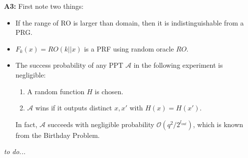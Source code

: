 \documentclass[12pt,reqno]{amsart}
\newcommand{\advrs}[0]{\mathcal{A}}
\begin{document}
\textbf{A3:} 
First note two things:
\begin{itemize}
	\item If the range of RO is larger than domain, then it is indistinguishable from a PRG.
	\item $F_k(x) = RO(k || x)$ is a PRF using random oracle $RO$.
	\item The success probability of any PPT $\advrs$ in the following experiment is negligible:
	\begin{enumerate}
		\item A random function $H$ is chosen.
		\item $\advrs$ wins if it outputs distinct $x, x'$ with $H(x)=H(x')$.
	\end{enumerate}
	In fact, $\advrs$ succeeds with negligible probability $\mathcal{O}(q^2/2^{l_{out}})$, which is known from the Birthday Problem.
\end{itemize}  

\textit{to do...}
\end{document}
